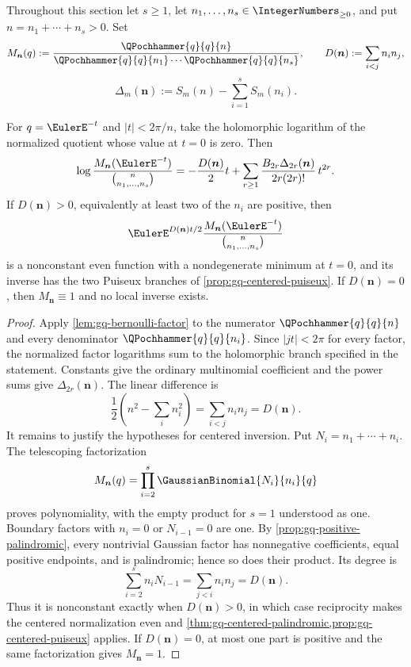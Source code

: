 Throughout this section let \(s\ge1\), let
\(n_1,\ldots,n_s\in\IntegerNumbers_{\ge0}\), and put
\(n=n_1+\cdots+n_s>0\).  Set
\[
  M_{\bm n}(q)
  :=\frac{\QPochhammer{q}{q}{n}}
  {\QPochhammer{q}{q}{n_1}\cdots\QPochhammer{q}{q}{n_s}},
  \qquad
  D(\bm n):=\sum_{i<j}n_in_j,
\]
\[
  \Delta_m(\bm n)
  :=S_m(n)-\sum_{i=1}^{s}S_m(n_i).
\]

\begin{theorem}
\label{thm:qm-one-log}
For \(q=\EulerE^{-t}\) and \(|t|<2\pi/n\), take the holomorphic logarithm
of the normalized quotient whose value at \(t=0\) is zero.  Then
\[
  \log\frac{M_{\bm n}(\EulerE^{-t})}
                {\binom{n}{n_1,\ldots,n_s}}
  =-\frac{D(\bm n)}2t+
   \sum_{r\ge1}
   \frac{B_{2r}\Delta_{2r}(\bm n)}
        {2r(2r)!}\,t^{2r}.
\]
If \(D(\bm n)>0\), equivalently at least two of the \(n_i\) are positive,
then
\[
 \EulerE^{D(\bm n)t/2}
 \frac{M_{\bm n}(\EulerE^{-t})}{\binom{n}{n_1,\ldots,n_s}}
\]
is a nonconstant even function with a nondegenerate minimum at \(t=0\), and
its inverse has the two Puiseux branches of
\cref{prop:gq-centered-puiseux}.  If \(D(\bm n)=0\), then
\(M_{\bm n}\equiv1\) and no local inverse exists.
\end{theorem}

\begin{proof}
Apply \cref{lem:gq-bernoulli-factor} to the numerator
\(\QPochhammer{q}{q}{n}\) and every denominator
\(\QPochhammer{q}{q}{n_i}\).  Since \(|jt|<2\pi\) for every factor, the
normalized factor logarithms sum to the holomorphic branch specified in the
statement.  Constants give the ordinary multinomial
coefficient and the power sums give \(\Delta_{2r}(\bm n)\).  The linear
difference is
\[
  \frac12\left(n^2-\sum_i n_i^2\right)
  =\sum_{i<j}n_in_j=D(\bm n).
\]
It remains to justify the hypotheses for centered inversion.  Put
\(N_i=n_1+\cdots+n_i\).  The telescoping factorization
\[
 M_{\bm n}(q)=\prod_{i=2}^{s}\GaussianBinomial{N_i}{n_i}{q}
\]
proves polynomiality, with the empty product for \(s=1\) understood as one.
Boundary factors with \(n_i=0\) or \(N_{i-1}=0\) are one.  By
\cref{prop:gq-positive-palindromic}, every nontrivial Gaussian factor has
nonnegative coefficients, equal positive endpoints, and is palindromic;
hence so does their product.
Its degree is
\[
 \sum_{i=2}^{s}n_iN_{i-1}
 =\sum_{j<i}n_in_j=D(\bm n).
\]
Thus it is nonconstant exactly when \(D(\bm n)>0\), in which case
reciprocity makes the centered normalization even and
\cref{thm:gq-centered-palindromic,prop:gq-centered-puiseux} applies.  If
\(D(\bm n)=0\), at most one part is positive and the same factorization gives
\(M_{\bm n}=1\).
\end{proof}

